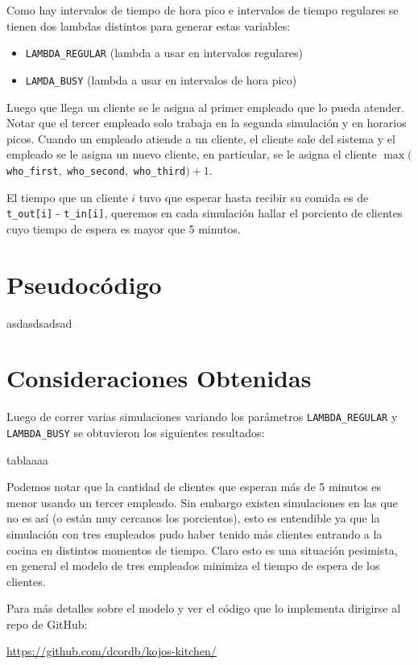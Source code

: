 \documentclass{article}
\begin{document}
        Como hay intervalos de tiempo de hora pico e intervalos de tiempo regulares se tienen dos lambdas distintos para generar
        estas variables:
            \begin{itemize}[label=\textbullet]
                \item \texttt{LAMBDA\_REGULAR} (lambda a usar en intervalos regulares)
                \item \texttt{LAMDA\_BUSY} (lambda a usar en intervalos de hora pico)
            \end{itemize}

        Luego que llega un cliente se le asigna al primer empleado que lo pueda atender. Notar que el tercer empleado solo
        trabaja en la segunda simulación y en horarios picos. Cuando un empleado atiende a un cliente, el cliente sale del sistema y
        el empleado se le asigna un nuevo cliente, en particular, se le asigna el cliente $\max($\texttt{who\_first}$,$ \texttt{who\_second}$,$ \texttt{who\_third}$) + 1$.

        El tiempo que un cliente $i$ tuvo que esperar hasta recibir su comida es de \texttt{t\_out[i]} - \texttt{t\_in[i]}, queremos en cada simulación
        hallar el porciento de clientes cuyo tiempo de espera es mayor que 5 minutos.

    \section*{Pseudocódigo}
            asdasdsadsad

    \section*{Consideraciones Obtenidas}
        Luego de correr varias simulaciones variando los parámetros \texttt{LAMBDA\_REGULAR} y \texttt{LAMBDA\_BUSY} se obtuvieron los siguientes resultados:

        tablaaaa

        Podemos notar que la cantidad de clientes que esperan más de 5 minutos es menor usando un tercer empleado. Sin embargo existen simulaciones
        en las que no es así (o están muy cercanos los porcientos), esto es entendible ya que la simulación con tres empleados pudo haber tenido más clientes
        entrando a la cocina en distintos momentos de tiempo. Claro esto es una situación pesimista, en general el modelo de tres empleados minimiza el
        tiempo de espera de los clientes.

        Para más detalles sobre el modelo y ver el código que lo implementa dirigirse al repo de GitHub:

        \href{https://github.com/dcordb/kojos-kitchen/}{https://github.com/dcordb/kojos-kitchen/}
\end{document}

